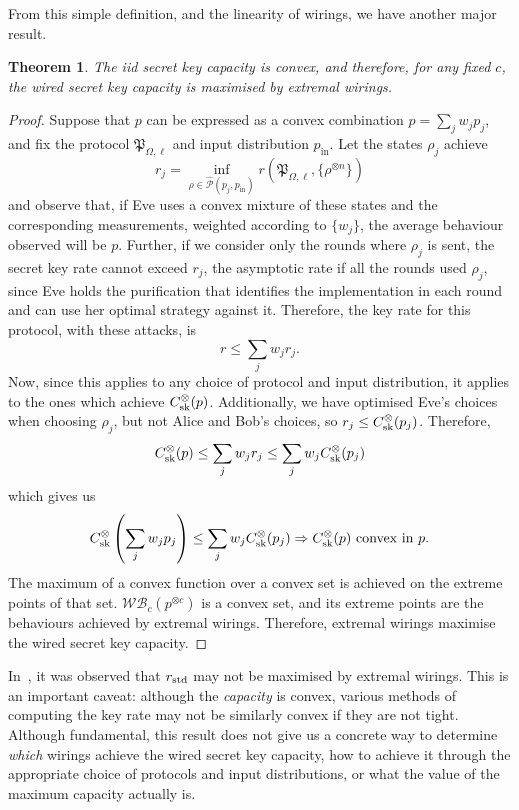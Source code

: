 \documentclass[10pt, a4paper]{article}
\numberwithin{equation}{section} %
\newcounter{stmt} %
\theoremstyle{definition}
\theoremstyle{plain}
\newtheorem{theorem}[stmt]{Theorem}
\newcommand{\?}{\mathrel{?}} %
\newcommand{\sWB}{\mathcal{WB}}
\newcommand{\compatstates}[3][]{\hat{\mathcal{P}}#1(#2,#3)}
\newcommand{\proto}[2][\ell]{\mathfrak{P}_{#2, #1}}
\newcommand{\prin}[1][p]{#1_{\mathrm{in}}}
\newcommand{\sk}{\rm sk}
\newcommand{\std}{\rm std}
\begin{document}
                      From this simple definition, and the linearity of wirings, we have another major result.
                      \begin{theorem}\label{thm:extrcap}
                        The iid secret key capacity is convex, and therefore, for any fixed \(c\), the wired secret key capacity is maximised by extremal wirings.
                      \end{theorem}
                      \begin{proof}
                        Suppose that \(p\) can be expressed as a convex combination \(p = \sum_j w_j p_j\), and fix the protocol \(\proto{\Omega}\) and input distribution \(\prin\). Let the states \(\rho_j\) achieve
                        \[ r_j = \inf_{\rho \in \compatstates{p_j}{\prin}} r\left(\proto{\Omega}, \{\rho^{\otimes n}\} \right) \]
                        and observe that, if Eve uses a convex mixture of these states and the corresponding measurements, weighted according to \(\{w_j\}\), the average behaviour observed will be \(p\). Further, if we consider only the rounds where \(\rho_j\) is sent, the secret key rate cannot exceed \(r_j\), the asymptotic rate if all the rounds used \(\rho_j\), since Eve holds the purification that identifies the implementation in each round and can use her optimal strategy against it. Therefore, the key rate for this protocol, with these attacks, is
                        \[ r \leq \sum_j w_j r_j. \]
                        Now, since this applies to any choice of protocol and input distribution, it applies to the ones which achieve \(C_{\sk}^{\otimes}(p)\). Additionally, we have optimised Eve's choices when choosing \(\rho_j\), but not Alice and Bob's choices, so \(r_j \leq C_{\sk}^{\otimes}(p_j)\). Therefore,
                        \[ C_{\sk}^{\otimes}(p) \leq \sum_j w_j r_j \leq \sum_j w_j C_{\sk}^{\otimes}(p_j) \]
                        which gives us
                        \[
                          C_{\sk}^{\otimes}\left(\sum_j w_j p_j\right) \leq \sum_j w_j C_{\sk}^{\otimes}(p_j) \Rightarrow C_{\sk}^{\otimes}(p)\text{ convex in }p.
                        \]
                        The maximum of a convex function over a convex set is achieved on the extreme points of that set. \(\sWB_c(p^{\otimes c})\) is a convex set, and its extreme points are the behaviours achieved by extremal wirings. Therefore, extremal wirings maximise the wired secret key capacity.
                      \end{proof}

                      In~\cite{JanLiThesis}, it was observed that \(r_{\std}\) may not be maximised by extremal wirings. This is an important caveat: although the \emph{capacity} is convex, various methods of computing the key rate may not be similarly convex if they are not tight. Although fundamental, this result does not give us a concrete way to determine \emph{which} wirings achieve the wired secret key capacity, how to achieve it through the appropriate choice of protocols and input distributions, or what the value of the maximum capacity actually is.
\end{document}
